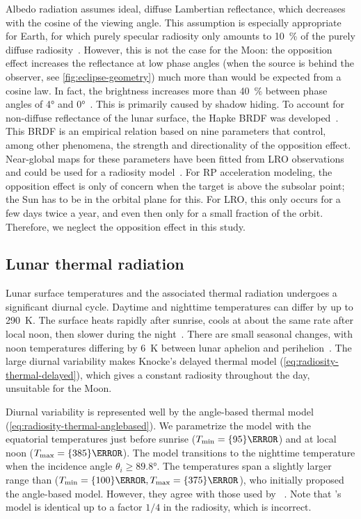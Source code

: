 Albedo radiation assumes ideal, diffuse Lambertian reflectance, which decreases with the cosine of the viewing angle. This assumption is especially appropriate for Earth, for which purely specular radiosity only amounts to \qty{10}{\percent} of the purely diffuse radiosity~\cite{Knocke1988}. However, this is not the case for the Moon: the opposition effect increases the reflectance at low phase angles (when the source is behind the observer, see \cref{fig:eclipse-geometry}) much more than would be expected from a cosine law. In fact, the brightness increases more than \qty{40}{\percent} between phase angles of \ang{4} and \ang{0}~\cite{Buratti1996}. This is primarily caused by shadow hiding. To account for non-diffuse reflectance of the lunar surface, the Hapke \gls{BRDF} was developed~\cite{Hapke2012}. This \gls{BRDF} is an empirical relation based on nine parameters that control, among other phenomena, the strength and directionality of the opposition effect. Near-global maps for these parameters have been fitted from \gls{LRO} observations and could be used for a radiosity model~\cite{Sato2014}. For \gls{RP} acceleration modeling, the opposition effect is only of concern when the target is above the subsolar point; the Sun has to be in the orbital plane for this. For \gls{LRO}, this only occurs for a few days twice a year, and even then only for a small fraction of the orbit. Therefore, we neglect the opposition effect in this study.




\subsection{Lunar thermal radiation}

Lunar surface temperatures and the associated thermal radiation undergoes a significant diurnal cycle. Daytime and nighttime temperatures can differ by up to \qty{290}{\K}. The surface heats rapidly after sunrise, cools at about the same rate after local noon, then slower during the night~\cite{Vasavada2012}. There are small seasonal changes, with noon temperatures differing by \qty{6}{\K} between lunar aphelion and perihelion~\cite{Heiken1991}. The large diurnal variability makes Knocke's delayed thermal model (\cref{eq:radiosity-thermal-delayed}), which gives a constant radiosity throughout the day, unsuitable for the Moon.

Diurnal variability is represented well by the angle-based thermal model (\cref{eq:radiosity-thermal-anglebased}). We parametrize the model with the equatorial temperatures just before sunrise ($T_\textnormal{min} = \qty{95}{\K}$) and at local noon ($T_\textnormal{max} = \qty{385}{\K}$). The model transitions to the nighttime temperature when the incidence angle $\theta_i \geq \ang{89.8}$. The temperatures span a slightly larger range than \citeauthor{Lemoine2013} ($T_\textnormal{min} = \qty{100}{\K}, T_\textnormal{max} = \qty{375}{\K}$), who initially proposed the angle-based model. However, they agree with those used by \citeauthor{Park2011}~\cite{Park2011}. Note that \citeauthor{Park2011}'s model is identical up to a factor $1/4$ in the radiosity, which is incorrect.

